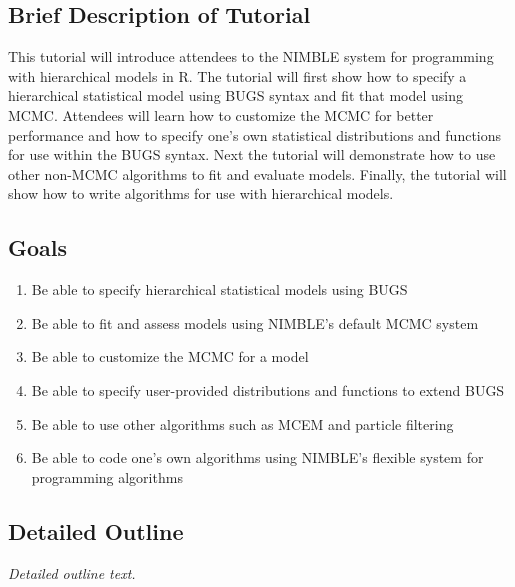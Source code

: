 \documentclass[]{article}
\providecommand{\tightlist}{%
  \setlength{\itemsep}{0pt}\setlength{\parskip}{0pt}}
\begin{document}
\subsection{Brief Description of
Tutorial}\label{brief-description-of-tutorial}

This tutorial will introduce attendees to the NIMBLE system for programming with hierarchical models in R. The tutorial will first show how to specify a hierarchical statistical model using BUGS syntax and fit that model using MCMC. Attendees will learn how to customize the MCMC for better performance and how to specify one's own statistical distributions and functions for use within the BUGS syntax. Next the tutorial will demonstrate how to use other non-MCMC algorithms to fit and evaluate models. Finally, the tutorial will show how to write algorithms for use with hierarchical models. 

\subsection{Goals}\label{goals}

\begin{enumerate}
\def\labelenumi{\arabic{enumi}.}
\tightlist
\item
 Be able to specify hierarchical statistical models using BUGS
\item
 Be able to fit and assess models using NIMBLE's default MCMC system
\item
  Be able to customize the MCMC for a model
\item
  Be able to specify user-provided distributions and functions to extend BUGS
\item
Be able to use other algorithms such as MCEM and particle filtering
\item
Be able to code one's own algorithms using NIMBLE's flexible system for programming algorithms
\end{enumerate}

\subsection{Detailed Outline}\label{detailed-outline}

\emph{Detailed outline text.}
\end{document}
